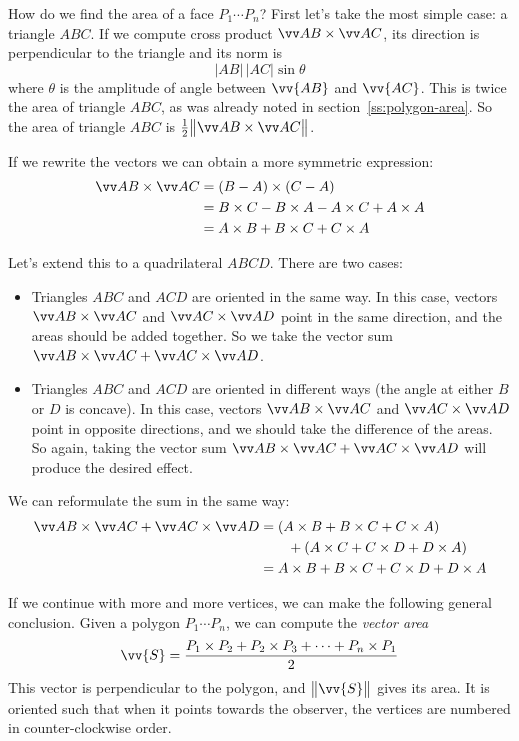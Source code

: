 
How do we find the area of a face $P_1\cdots P_n$? First let's take the most simple case: a triangle $ABC$.
If we compute cross product $\crossv{AB}{AC}$, its direction is perpendicular to the triangle and its norm is
\[|AB|\,|AC| \sin\theta\]
where $\theta$ is the amplitude of angle between $\vv{AB}$ and $\vv{AC}$.
This is twice the area of triangle $ABC$, as was already noted in section~\ref{ss:polygon-area}.
So the area of triangle $ABC$ is $\frac{1}{2}\big\|\crossv{AB}{AC}\big\|$.


If we rewrite the vectors we can obtain a more symmetric expression:
\begin{align*}
\crossv{AB}{AC}
&= (B-A)\times(C-A) \\
&= B \times C - B \times A - A \times C + A \times A \\
&= A \times B + B \times C + C \times A
\end{align*}

Let's extend this to a quadrilateral $ABCD$. There are two cases:
\begin{itemize}
\item Triangles $ABC$ and $ACD$ are oriented in the same way. In this case, vectors $\crossv{AB}{AC}$ and $\crossv{AC}{AD}$ point in the same direction, and the areas should be added together. So we take the vector sum $\crossv{AB}{AC} + \crossv{AC}{AD}$.
\item Triangles $ABC$ and $ACD$ are oriented in different ways (the angle at either $B$ or $D$ is concave). In this case, vectors $\crossv{AB}{AC}$ and $\crossv{AC}{AD}$ point in opposite directions, and we should take the difference of the areas. So again, taking the vector sum $\crossv{AB}{AC} + \crossv{AC}{AD}$ will produce the desired effect.
\end{itemize}


We can reformulate the sum in the same way:
\begin{align*}
\crossv{AB}{AC} + \crossv{AC}{AD}
&= (A \times B + B \times C + C \times A) \\
&\qquad + (A \times C + C \times D + D \times A) \\
&= A \times B + B \times C + C \times D + D \times A
\end{align*}

If we continue with more and more vertices, we can make the following general conclusion. Given a polygon $P_1\cdots P_n$, we can compute the \emph{vector area}
\[\vv{S} = \frac{P_1 \times P_2 + P_2 \times P_3 + \cdots + P_n \times P_1}{2}\]
This vector is perpendicular to the polygon, and $\big\|\vv{S}\big\|$ gives its area. It is oriented such that when it points towards the observer, the vertices are numbered in counter-clockwise order.

